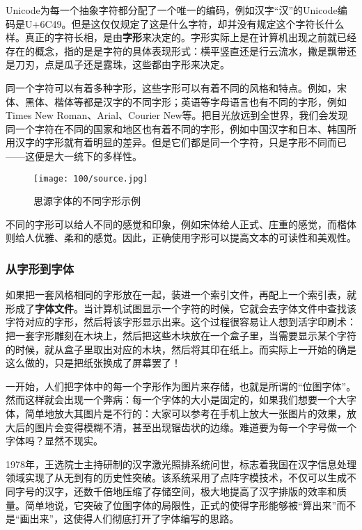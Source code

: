 Unicode为每一个抽象字符都分配了一个唯一的编码，例如汉字“汉”的Unicode编码是U+6C49。但是这仅仅规定了这是什么字符，却并没有规定这个字符长什么样。真正的字符长相，是由\textbf{字形}来决定的。字形实际上是在计算机出现之前就已经存在的概念，指的是是字符的具体表现形式：横平竖直还是行云流水，撇是飘带还是刀刃，点是瓜子还是露珠，这些都由字形来决定。

同一个字符可以有着多种字形，这些字形可以有着不同的风格和特点。例如，宋体、黑体、楷体等都是汉字的不同字形；英语等字母语言也有不同的字形，例如Times New Roman、Arial、Courier New等。把目光放远到全世界，我们会发现同一个字符在不同的国家和地区也有着不同的字形，例如中国汉字和日本、韩国所用汉字的字形就有着明显的差异。但是它们都是同一个字符，只是字形不同而已——这便是大一统下的多样性。

\begin{figure}[htbp]
  \centering
  \texttt{[image: 100/source.jpg]}
  \caption{思源字体的不同字形示例}
\end{figure}

不同的字形可以给人不同的感觉和印象，例如宋体给人正式、庄重的感觉，而楷体则给人优雅、柔和的感觉。因此，正确使用字形可以提高文本的可读性和美观性。

\subsubsection{从字形到字体}

如果把一套风格相同的字形放在一起，装进一个索引文件，再配上一个索引表，就形成了\textbf{字体文件}。当计算机试图显示一个字符的时候，它就会去字体文件中查找该字符对应的字形，然后将该字形显示出来。这个过程很容易让人想到活字印刷术：把一套字形雕刻在木块上，然后把这些木块放在一个盒子里，当需要显示某个字符的时候，就从盒子里取出对应的木块，然后将其印在纸上。而实际上一开始的确是这么做的，只是把纸张换成了屏幕罢了！

一开始，人们把字体中的每一个字形作为图片来存储，也就是所谓的“位图字体”。然而这样就会出现一个弊病：每一个字体的大小是固定的，如果我们想要一个大字体，简单地放大其图片是不行的：大家可以参考在手机上放大一张图片的效果，放大后的图片会变得模糊不清，甚至出现锯齿状的边缘。难道要为每一个字号做一个字体吗？显然不现实。

1978年，王选院士主持研制的汉字激光照排系统问世，标志着我国在汉字信息处理领域实现了从无到有的历史性突破。该系统采用了点阵字模技术，不仅可以生成不同字号的汉字，还数千倍地压缩了存储空间，极大地提高了汉字排版的效率和质量。简单地说，它突破了位图字体的局限性，正式的使得字形能够被“算出来”而不是“画出来”，这使得人们彻底打开了字体编写的思路。

